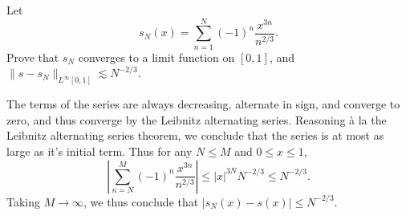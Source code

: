 \documentclass[answers]{exam}
\DeclareMathOperator{\RR}{\mathbb{R}}
\begin{document}
\begin{questions}
\question Let
%
\[ s_N(x) = \sum_{n = 1}^N (-1)^n \frac{x^{3n}}{n^{2/3}}. \]
%
Prove that $s_N$ converges to a limit function on $[0,1]$, and $\| s - s_N \|_{L^\infty[0,1]} \lesssim N^{-2/3}$.
\begin{solution}
	The terms of the series are always decreasing, alternate in sign, and converge to zero, and thus converge by the Leibnitz alternating series. Reasoning à la the Leibnitz alternating series theorem, we conclude that the series is at most as large as it's initial term. Thus for any $N \leq M$ and $0 \leq x \leq 1$,
	\[ |\sum_{n = N}^M (-1)^n \frac{x^{3n}}{n^{2/3}}| \leq |x|^{3N} N^{-2/3} \leq N^{-2/3}. \]
	Taking $M \to \infty$, we thus conclude that $|s_N(x) - s(x)| \leq N^{-2/3}$.
\end{solution}

\question
{}
\end{questions}
\end{document}
